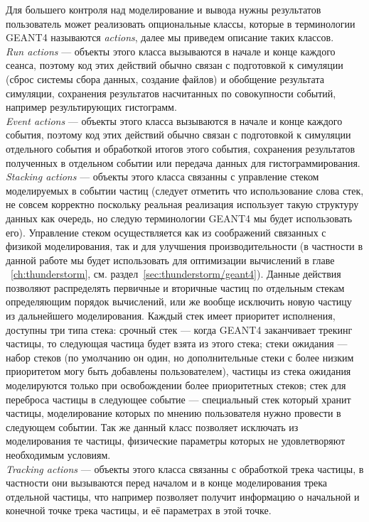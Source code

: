 Для большего контроля над моделирование и вывода нужны результатов пользователь может реализовать опциональные классы, которые в терминологии GEANT4 называются \textit{actions}, далее мы приведем описание таких классов.\\
\textit{Run actions} --- объекты этого класса вызываются в начале и конце каждого сеанса, поэтому код этих действий обычно связан с  подготовкой к симуляции (сброс системы сбора данных, создание файлов) и обобщение результата симуляции, сохранения результатов насчитанных по совокупности событий, например результирующих гистограмм.\\
\textit{Event actions} ---  объекты этого класса вызываются в начале и конце каждого события,  поэтому код этих действий обычно связан с  подготовкой к симуляции отдельного события и обработкой итогов этого события, сохранения результатов полученных в отдельном событии или передача данных для гистограммирования. \\
\textit{Stacking actions} --- объекты этого класса связанны с управление стеком моделируемых в событии частиц (следует отметить что использование слова стек, не совсем корректно поскольку реальная реализация использует такую структуру данных как очередь, но следую терминологии GEANT4 мы будет использовать его). Управление стеком осуществляется как из соображений связанных с физикой моделирования, так и для улучшения производительности (в частности в данной работе мы будет использовать для оптимизации вычислений в главе ~\ref{ch:thunderstorm}, см. раздел~\ref{sec:thunderstorm/geant4}). Данные действия позволяют распределять первичные и вторичные частиц по отдельным стекам определяющим порядок вычислений, или же вообще исключить новую частицу из дальнейшего моделирования. Каждый стек имеет приоритет исполнения, доступны три типа стека: срочный стек  --- когда GEANT4 заканчивает трекинг частицы, то следующая частица будет взята из этого стека; стеки ожидания --- набор стеков (по умолчанию он один, но дополнительные стеки с более низким приоритетом могу быть добавлены пользователем), частицы из стека ожидания моделируются только при освобождении более приоритетных стеков; стек для переброса частицы в следующее событие --- специальный стек который хранит частицы, моделирование которых по мнению пользователя нужно провести в следующем событии. Так же данный класс позволяет исключать из моделирования те частицы, физические параметры которых не удовлетворяют необходимым условиям.\\
\textit{Tracking actions} --- объекты этого класса связанны с обработкой трека частицы, в частности они вызываются перед началом и в конце моделирования трека отдельной частицы, что например позволяет получит информацию о начальной и конечной точке трека частицы, и её параметрах в этой точке.\\
